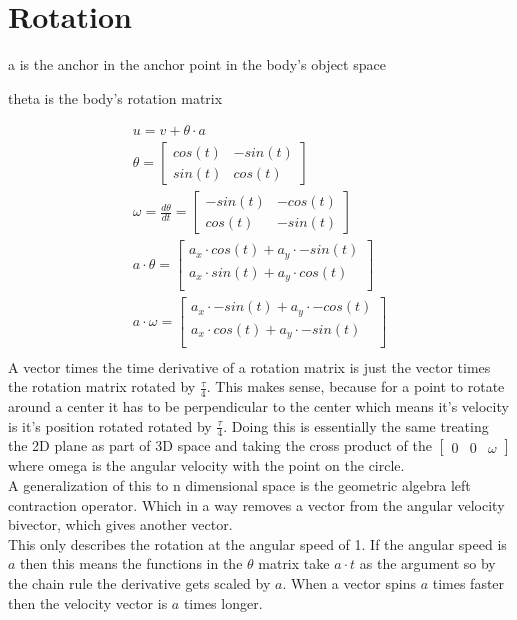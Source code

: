 \documentclass{article}
\begin{document}
\section*{Rotation}
\centerline{a is the anchor in the anchor point in the body's object space}
\centerline{theta is the body's rotation matrix}

\begin{gather}
u = v + \theta \cdot a \\
\theta = 
\begin{bmatrix}
    cos(t) & -sin(t) \\ 
    sin(t) & cos(t)
\end{bmatrix} \\
\omega = \frac{d\theta}{dt} =
\begin{bmatrix}
    -sin(t) & -cos(t) \\ 
    cos(t) & -sin(t)
\end{bmatrix} \\
a \cdot \theta = 
\begin{bmatrix}
a _x \cdot cos(t) + a _y \cdot -sin(t) \\
a _x \cdot sin(t) + a _y \cdot cos(t) \\
\end{bmatrix} \\
a \cdot \omega = 
\begin{bmatrix}
a _x \cdot -sin(t) + a _y \cdot -cos(t) \\
a _x \cdot cos(t) + a _y \cdot -sin(t) \\
\end{bmatrix} \\
\end{gather}
A vector times the time derivative of a rotation matrix is just the vector times the rotation matrix rotated by \(\frac{\tau}{4}\). This makes sense, because for a point to rotate around a center it has to be perpendicular to the center which means it's velocity is it's position rotated rotated by \(\frac{\tau}{4}\). Doing this is essentially the same treating the 2D plane as part of 3D space and taking the cross product of the $ \begin{bmatrix} 0 & 0 & \omega \end{bmatrix} $ where omega is the angular velocity with the point on the circle. \\
A generalization of this to n dimensional space is the geometric algebra left contraction operator. Which in a way removes a vector from the angular velocity bivector, which gives another vector. \\
This only describes the rotation at the angular speed of 1. If the angular speed is $a$ then this means the functions in the $\theta$ matrix take $ a \cdot t $ as the argument so by the chain rule the derivative gets scaled by $a$. When a vector spins $a$ times faster then the velocity vector is $a$ times longer.
\end{document}

